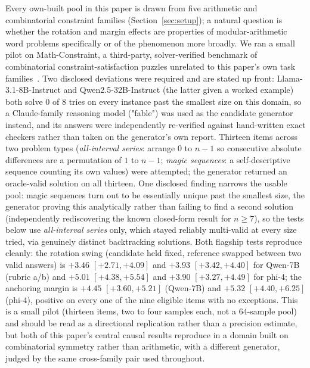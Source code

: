 \documentclass[11pt]{article}
\begin{document}
Every own-built pool in this paper is drawn from five arithmetic and combinatorial constraint families (Section~\ref{sec:setup}); a natural question is whether the rotation and margin effects are properties of modular-arithmetic word problems specifically or of the phenomenon more broadly. We ran a small pilot on Math-Constraint, a third-party, solver-verified benchmark of combinatorial constraint-satisfaction puzzles unrelated to this paper's own task families~\cite{mathconstraint2026}. Two disclosed deviations were required and are stated up front: Llama-3.1-8B-Instruct and Qwen2.5-32B-Instruct (the latter given a worked example) both solve $0$ of $8$ tries on every instance past the smallest size on this domain, so a Claude-family reasoning model ("fable") was used as the candidate generator instead, and its answers were independently re-verified against hand-written exact checkers rather than taken on the generator's own report. Thirteen items across two problem types (\emph{all-interval series}: arrange $0$ to $n{-}1$ so consecutive absolute differences are a permutation of $1$ to $n{-}1$; \emph{magic sequences}: a self-descriptive sequence counting its own values) were attempted; the generator returned an oracle-valid solution on all thirteen. One disclosed finding narrows the usable pool: magic sequences turn out to be essentially unique past the smallest size, the generator proving this analytically rather than failing to find a second solution (independently rediscovering the known closed-form result for $n\!\geq\!7$), so the tests below use \emph{all-interval series} only, which stayed reliably multi-valid at every size tried, via genuinely distinct backtracking solutions. Both flagship tests reproduce cleanly: the rotation swing (candidate held fixed, reference swapped between two valid answers) is $+3.46$ $[+2.71,+4.09]$ and $+3.93$ $[+3.42,+4.40]$ for Qwen-7B (rubric a/b) and $+5.01$ $[+4.38,+5.54]$ and $+3.90$ $[+3.27,+4.49]$ for phi-4; the anchoring margin is $+4.45$ $[+3.60,+5.21]$ (Qwen-7B) and $+5.32$ $[+4.40,+6.25]$ (phi-4), positive on every one of the nine eligible items with no exceptions. This is a small pilot (thirteen items, two to four samples each, not a $64$-sample pool) and should be read as a directional replication rather than a precision estimate, but both of this paper's central causal results reproduce in a domain built on combinatorial symmetry rather than arithmetic, with a different generator, judged by the same cross-family pair used throughout.
\end{document}
